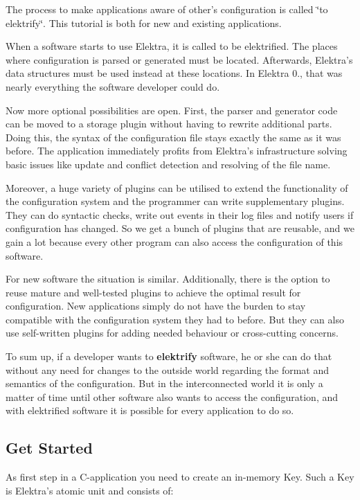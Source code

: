 The process to make applications aware of other's configuration is called \char`\"{}to elektrify\char`\"{}. This tutorial is both for new and existing applications.

When a software starts to use Elektra, it is called to be elektrified. The places where configuration is parsed or generated must be located. Afterwards, Elektra's data structures must be used instead at these locations. In Elektra 0., that was nearly everything the software developer could do.

Now more optional possibilities are open. First, the parser and generator code can be moved to a storage plugin without having to rewrite additional parts. Doing this, the syntax of the configuration file stays exactly the same as it was before. The application immediately profits from Elektra's infrastructure solving basic issues like update and conflict detection and resolving of the file name.

Moreover, a huge variety of plugins can be utilised to extend the functionality of the configuration system and the programmer can write supplementary plugins. They can do syntactic checks, write out events in their log files and notify users if configuration has changed. So we get a bunch of plugins that are reusable, and we gain a lot because every other program can also access the configuration of this software.

For new software the situation is similar. Additionally, there is the option to reuse mature and well-\/tested plugins to achieve the optimal result for configuration. New applications simply do not have the burden to stay compatible with the configuration system they had to before. But they can also use self-\/written plugins for adding needed behaviour or cross-\/cutting concerns.

To sum up, if a developer wants to {\bfseries elektrify} software, he or she can do that without any need for changes to the outside world regarding the format and semantics of the configuration. But in the interconnected world it is only a matter of time until other software also wants to access the configuration, and with elektrified software it is possible for every application to do so.

\subsection*{Get Started}

As first step in a C-\/application you need to create an in-\/memory {\ttfamily Key}. Such a {\ttfamily Key} is Elektra's atomic unit and consists of\+:



